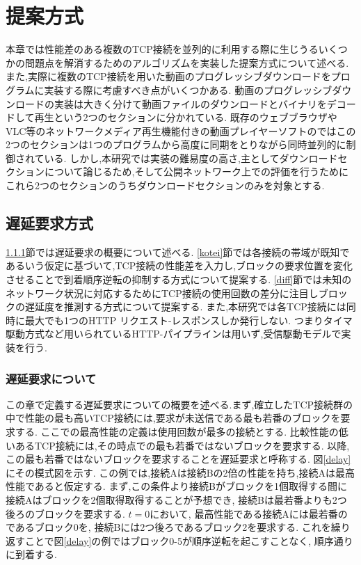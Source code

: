 \documentclass[a4j,12pt]{gradthesis_utf8}
\begin{document}
\chapter{提案方式}\label{sec:sec3}
本章では性能差のある複数のTCP接続を並列的に利用する際に生じうるいくつかの問題点を解消するためのアルゴリズムを実装した提案方式について述べる.
また,実際に複数のTCP接続を用いた動画のプログレッシブダウンロードをプログラムに実装する際に考慮すべき点がいくつかある.
動画のプログレッシブダウンロードの実装は大きく分けて動画ファイルのダウンロードとバイナリをデコードして再生という2つのセクションに分かれている.
既存のウェブブラウザやVLC\cite{vlc}等のネットワークメディア再生機能付きの動画プレイヤーソフトのではこの2つのセクションは1つのプログラムから高度に同期をとりながら同時並列的に制御されている.
しかし,本研究では実装の難易度の高さ,主としてダウンロードセクションについて論じるため,そして公開ネットワーク上での評価を行うためにこれら2つのセクションのうちダウンロードセクションのみを対象とする.

\section{遅延要求方式}
\label{chienyokyuhoshiki}
\ref{chienyokyu}節では遅延要求の概要について述べる.
\ref{kotei}節では各接続の帯域が既知であるいう仮定に基づいて,TCP接続の性能差を入力し,ブロックの要求位置を変化させることで到着順序逆転の抑制する方式について提案する.
\ref{diff}節では未知のネットワーク状況に対応するためにTCP接続の使用回数の差分に注目しブロックの遅延度を推測する方式について提案する.
また,本研究では各TCP接続には同時に最大でも1つのHTTP リクエスト-レスポンスしか発行しない.
つまりタイマ駆動方式など用いられているHTTP-パイプラインは用いず,受信駆動モデルで実装を行う.

\newpage

\subsection{遅延要求について}
\label{chienyokyu}
この章で定義する遅延要求についての概要を述べる.まず,確立したTCP接続群の中で性能の最も高いTCP接続には,要求が未送信である最も若番のブロックを要求する.
ここでの最高性能の定義は使用回数が最多の接続とする.
比較性能の低いあるTCP接続には,その時点での最も若番ではないブロックを要求する.
以降,この最も若番ではないブロックを要求することを遅延要求と呼称する.
図\ref{delay}にその模式図を示す.
この例では,接続Aは接続Bの2倍の性能を持ち,接続Aは最高性能であると仮定する.
まず,この条件より接続Bがブロックを1個取得する間に接続Aはブロックを2個取得取得することが予想でき,
接続Bは最若番よりも2つ後ろのブロックを要求する.
\begin{math}t=0\end{math}において,
最高性能である接続Aには最若番のであるブロック0を,
接続Bには2つ後ろであるブロック2を要求する.
これを繰り返すことで図\ref{delay}の例ではブロック0-5が順序逆転を起こすことなく,
順序通りに到着する.
\end{document}
